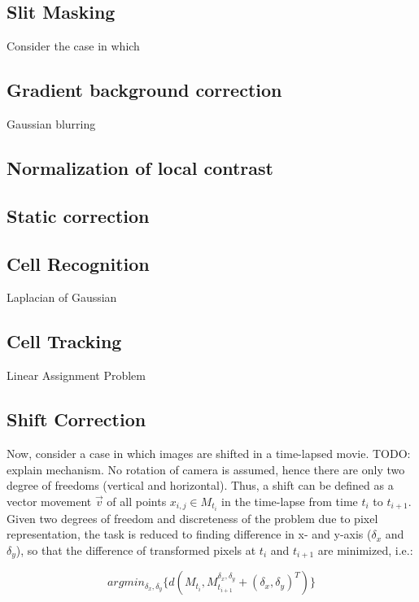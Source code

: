 \documentclass[pdftex,12pt,a4paper]{report}
\begin{document}
\subsection{Slit Masking}

Consider the case in which 

\subsection{Gradient background correction}

Gaussian blurring

\subsection{Normalization of local contrast}

\subsection{Static correction}

\subsection{Cell Recognition}

Laplacian of Gaussian

\subsection{Cell Tracking}

Linear Assignment Problem

\subsection{Shift Correction}

Now, consider a case in which images are shifted in a time-lapsed movie. TODO: explain mechanism. No rotation of camera is assumed, hence there are only two degree of freedoms (vertical and horizontal). Thus, a shift can be defined as a vector movement $\vec{v}$ of all points $x_{i,j} \in M_{t_i}$ in the time-lapse from time $t_i$ to $t_{i+1}$. Given two degrees of freedom and discreteness of the problem due to pixel representation, the task is reduced to finding difference in x- and y-axis ($\delta_x$ and $\delta_y$), so that the difference of transformed pixels at $t_i$ and $t_{i+1}$ are minimized, i.e.:

$$
argmin_{\delta_x, \delta_y} \{d(M_{t_i}, M_{t_{i+1}}^{\delta_x, \delta_y} + (\delta_x, \delta_y)^T)\}
$$
\end{document}
